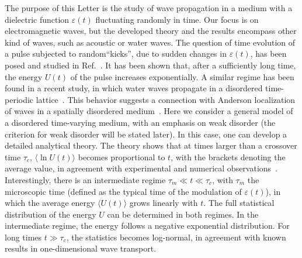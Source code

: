 \documentclass[ prl, twocolumn, superscriptaddress, amsfonts, amsmath,floatfix]{revtex4-1}
\begin{document}
The purpose of this Letter is the study of wave propagation in a medium with a dielectric function $\varepsilon(t)$ fluctuating randomly in time. Our focus is on electromagnetic waves, but the developed theory and the results encompass other kind of waves, such as acoustic or water waves. The question of time evolution of a pulse subjected to random``kicks'', due to sudden changes in $\varepsilon(t)$, has been posed and studied in Ref.~\cite{Sharabi2021}. It has been shown that, after a sufficiently long time, the energy $U(t)$ of the pulse increases exponentially. A similar regime has been found in a recent study, in which water waves propagate in a disordered time-periodic lattice~\cite{Apffel2021}. This behavior suggests a connection with Anderson localization of waves in a spatially disordered medium~\cite{Anderson}. Here we consider a general model of a disordered time-varying medium, with an emphasis on weak disorder (the criterion for weak disorder will be stated later). In this case, one can develop a detailed analytical theory. The theory shows that at times larger than a crossover time $\tau_c$, $\langle \ln U(t) \rangle$ becomes proportional to $t$, with the brackets denoting the average value, in agreement with experimental and numerical observations~\cite{Sharabi2021,Apffel2021}. Interestingly, there is an intermediate regime $\tau_m \ll t \ll \tau_c$, with $\tau_m$ the microscopic time (defined as the typical time of the modulation of $\varepsilon(t)$), in which the average energy $\langle U(t) \rangle$ grows linearly with $t$. The full statistical distribution of the energy $U$ can be determined in both regimes. In the intermediate regime, the energy follows a negative exponential distribution. For long times $t \gg \tau_c$, the statistics becomes log-normal, in agreement with known results in one-dimensional wave transport.
\end{document}
